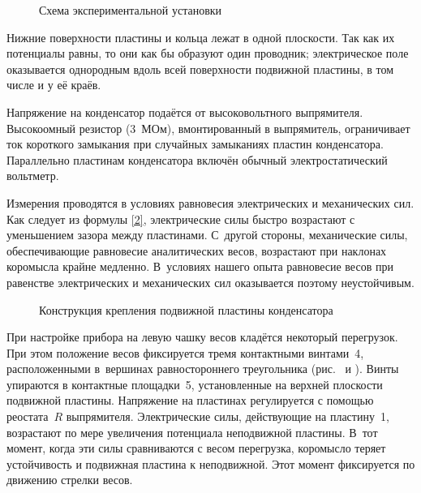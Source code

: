 \begin{figure}[h!]
    \centering
    \caption{Схема экспериментальной установки}
\end{figure}

Нижние поверхности пластины и кольца лежат в одной плоскости. Так как их
потенциалы равны, то они как бы образуют один
проводник; электрическое поле оказывается однородным вдоль всей поверхности
подвижной пластины, в том числе и у её краёв.

Напряжение на конденсатор подаётся от высоковольтного выпрямителя. Высокоомный
резистор (3~МОм), вмонтированный в
выпрямитель, ограничивает ток короткого замыкания при случайных замыканиях
пластин конденсатора. Параллельно пластинам
конденсатора включён обычный электростатический вольтметр.

Измерения проводятся в условиях равновесия электрических и механических сил. Как
следует из формулы \eqref{2},
электрические силы быстро возрастают с уменьшением зазора между пластинами. 
С~другой стороны, механические силы,
обеспечивающие равновесие аналитических весов, возрастают при наклонах коромысла
крайне медленно. В~условиях нашего опыта равновесие весов при равенстве
электрических и механических сил оказывается поэтому неустойчивым.

\begin{wrapfigure}[17]{o}{0.35\textwidth}
	\caption{Конструкция крепления подвижной пластины конденсатора}
\end{wrapfigure}

При настройке прибора на левую чашку весов кладётся некоторый перегрузок. При
этом положение весов фиксируется тремя
контактными винтами~4, расположенными в~вершинах равностороннего треугольника
(рис.~ и ). 
Винты упираются в
контактные площадки~5, установленные на верхней плоскости подвижной пластины.
Напряжение на пластинах регулируется с
помощью реостата~$R$ выпрямителя. Электрические силы, действующие на пластину~1,
возрастают по мере увеличения
потенциала неподвижной пластины. В~тот момент, когда эти силы сравниваются
с весом перегрузка, коромысло теряет
устойчивость и подвижная пластина  к неподвижной. Этот момент
фиксируется по движению стрелки весов.

